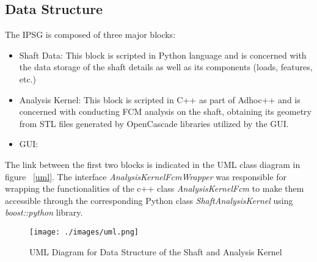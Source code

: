 \subsection{Data Structure}

The IPSG is composed of three major blocks:
\begin{itemize}
\item{Shaft Data}: This block is scripted in Python language and is concerned with the data storage of the shaft details as well as its components (loads, features, etc.)
\item{Analysis Kernel}: This block is scripted in C++ as part of Adhoc++ and is concerned with conducting FCM analysis on the shaft, obtaining its geometry from STL files generated by OpenCascade libraries utilized by the GUI.
\item{GUI}:
\end{itemize}

The link between the first two blocks is indicated in the UML class diagram in figure ~\ref{uml}. The interface \emph{AnalysisKernelFcmWrapper} was responsible for wrapping the functionalities of the c++ class \emph{AnalysisKernelFcm} to make them accessible through the corresponding Python class \emph{ShaftAnalysisKernel} using \emph{boost::python} library.

\begin{figure}
  \begin{center}
    \texttt{[image: ./images/uml.png]}
    \caption{UML Diagram for Data Structure of the Shaft and Analysis Kernel}
    \label{fig:uml}
  \end{center}
\end{figure}